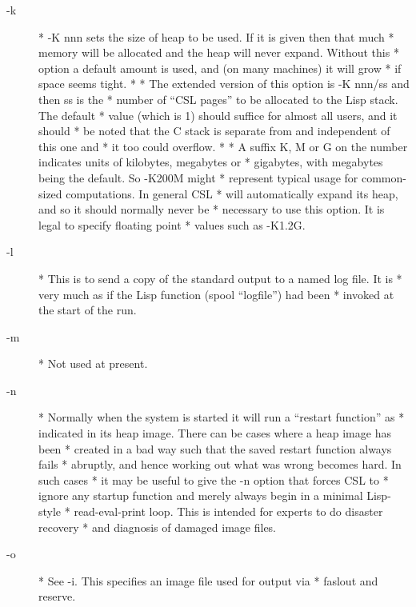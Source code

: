 \documentclass[a4paper,11pt]{article}
\begin{document}
\begin{description}
\item [{\ttfamily -k}] 
          * {\ttfamily -K nnn} sets the size of heap to be used.  If it is given then that much
          * memory will be allocated and the heap will never expand.  Without this
          * option a default amount is used, and (on many machines) it will grow
          * if space seems tight.
          *
          * The extended version of this option is {\ttfamily -K nnn/ss} and then ss is the
          * number of ``CSL pages'' to be allocated to the Lisp stack. The default
          * value (which is 1) should suffice for almost all users, and it should
          * be noted that the C stack is separate from and independent of this one and
          * it too could overflow.
          *
          * A suffix K, M or G on the number indicates units of kilobytes, megabytes or
          * gigabytes, with megabytes being the default. So {\ttfamily -K200M} might
          * represent typical usage for common-sized computations. In general CSL
          * will automatically expand its heap, and so it should normally never be
          * necessary to use this option. It is legal to specify floating point
          * values such as -K1.2G.

\item [{\ttfamily -l}] 
          * This is to send a copy of the standard output to a named log file. It is
          * very much as if the Lisp function {\ttfamily (spool ``logfile'')} had been
          * invoked at the start of the run.

\item [{\ttfamily -m}] 
          * Not used at present.

\item [{\ttfamily -n}] 
          * Normally when the system is started it will run a ``restart function'' as
          * indicated in its heap image. There can be cases where a heap image has been
          * created in a bad way such that the saved restart function always fails
          * abruptly, and hence working out what was wrong becomes hard. In such cases
          * it may be useful to give the {\ttfamily -n} option that forces CSL to
          * ignore any startup function and merely always begin in a minimal Lisp-style
          * read-eval-print loop. This is intended for experts to do disaster recovery
          * and diagnosis of damaged image files.

\item [{\ttfamily -o}] 
          * See {\ttfamily -i}. This specifies an image file used for output via
          * {\ttfamily faslout} and {\ttfamily reserve}.


\end{description}
\end{document}
